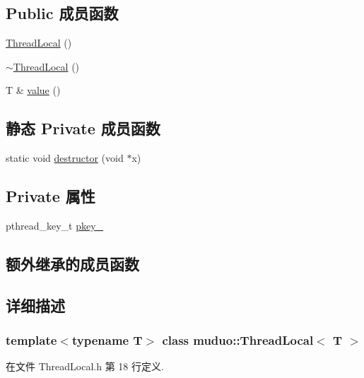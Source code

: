\subsection*{Public 成员函数}
\begin{DoxyCompactItemize}
\item 
\hyperlink{classmuduo_1_1ThreadLocal_a29759b045add7cf2215a0bd2ab2c70db}{Thread\+Local} ()
\item 
\hyperlink{classmuduo_1_1ThreadLocal_aa8a52dac4ecfb1abf1db1a6b093cb92e}{$\sim$\+Thread\+Local} ()
\item 
T \& \hyperlink{classmuduo_1_1ThreadLocal_a464298ad7afeafebbb149f566ecabbab}{value} ()
\end{DoxyCompactItemize}
\subsection*{静态 Private 成员函数}
\begin{DoxyCompactItemize}
\item 
static void \hyperlink{classmuduo_1_1ThreadLocal_a1d6d0f9453997bf458b23a4a0028bdb5}{destructor} (void $\ast$x)
\end{DoxyCompactItemize}
\subsection*{Private 属性}
\begin{DoxyCompactItemize}
\item 
pthread\+\_\+key\+\_\+t \hyperlink{classmuduo_1_1ThreadLocal_a10ef6ab4122ca7977f07a8c475f54017}{pkey\+\_\+}
\end{DoxyCompactItemize}
\subsection*{额外继承的成员函数}


\subsection{详细描述}
\subsubsection*{template$<$typename T$>$\newline
class muduo\+::\+Thread\+Local$<$ T $>$}



在文件 Thread\+Local.\+h 第 18 行定义.




